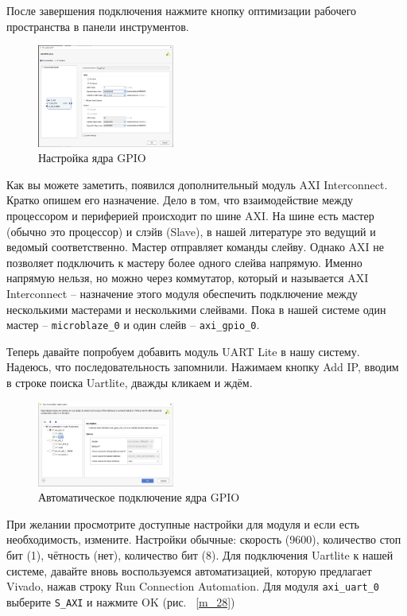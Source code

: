 \documentclass[a4paper,oneside ,14pt]{extreport}
\begin{document}
После завершения подключения нажмите кнопку оптимизации рабочего 
пространства в панели инструментов.

\begin{figure}[!ht]
	\centering
	\includegraphics[width=0.4\textwidth]{image/m_22.png}
	\caption{Настройка ядра GPIO}
	\label{m_22}
\end{figure}

Как вы можете заметить, появился дополнительный модуль 
AXI Interconnect. Кратко опишем его назначение. Дело в том, что 
взаимодействие между процессором и периферией происходит по шине AXI. 
На шине есть мастер (обычно это процессор) и слэйв (Slave), в 
нашей литературе это ведущий и ведомый соответственно. Мастер отправляет 
команды слейву. Однако AXI не позволяет подключить к мастеру более одного 
слейва напрямую. Именно напрямую нельзя, но можно через коммутатор, который и 
называется AXI Interconnect – назначение этого модуля обеспечить подключение 
между несколькими мастерами и несколькими слейвами. Пока в нашей системе 
один мастер –  \verb|microblaze_0| и один слейв –  \verb|axi_gpio_0|. 

Теперь давайте попробуем добавить модуль UART Lite в нашу систему.
Надеюсь, что последовательность запомнили. Нажимаем кнопку Add IP, вводим 
в строке поиска Uartlite, дважды кликаем и ждём. 

\begin{figure}[!ht]
	\centering
	\includegraphics[width=0.4\textwidth]{image/m_24.png}
	\caption{Автоматическое подключение ядра GPIO}
	\label{m_24}
\end{figure}

При желании просмотрите доступные настройки для модуля и если есть 
необходимость, измените. Настройки обычные: скорость (9600), количество стоп
бит (1), чётность (нет), количество бит (8).
Для подключения Uartlite к нашей системе, давайте вновь воспользуемся 
автоматизацией, которую предлагает Vivado, нажав строку Run Connection
Automation. Для модуля  \verb|axi_uart_0| выберите  \verb|S_AXI| и нажмите OK (рис. ~\ref{m_28})
\end{document}
